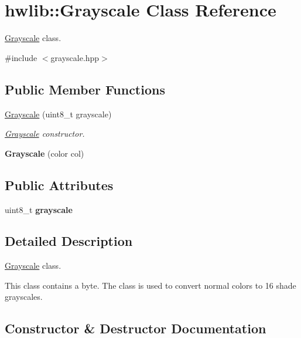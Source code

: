 \hypertarget{classhwlib_1_1Grayscale}{}\section{hwlib\+:\+:Grayscale Class Reference}
\label{classhwlib_1_1Grayscale}


\hyperlink{classhwlib_1_1Grayscale}{Grayscale} class.  




{\ttfamily \#include $<$grayscale.\+hpp$>$}

\subsection*{Public Member Functions}
\begin{DoxyCompactItemize}
\item 
\hyperlink{classhwlib_1_1Grayscale_a767111a47b1a5b762bbd3a38f7b78ede}{Grayscale} (uint8\+\_\+t grayscale)
\begin{DoxyCompactList}\small\item\em \hyperlink{classhwlib_1_1Grayscale}{Grayscale} constructor. \end{DoxyCompactList}\item 
\mbox{\label{classhwlib_1_1Grayscale_ab72d032ce771195c189b968fac6810f7}} 
{\bfseries Grayscale} (color col)
\end{DoxyCompactItemize}
\subsection*{Public Attributes}
\begin{DoxyCompactItemize}
\item 
\mbox{\label{classhwlib_1_1Grayscale_ad96611072c7330c426cbee3b9a94f196}} 
uint8\+\_\+t {\bfseries grayscale}
\end{DoxyCompactItemize}


\subsection{Detailed Description}
\hyperlink{classhwlib_1_1Grayscale}{Grayscale} class. 

This class contains a byte. The class is used to convert normal colors to 16 shade grayscales. 

\subsection{Constructor \& Destructor Documentation}
\mbox{\label{classhwlib_1_1Grayscale_a767111a47b1a5b762bbd3a38f7b78ede}} 
